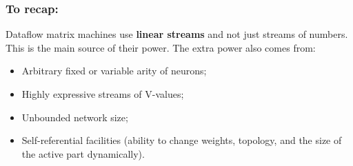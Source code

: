 \documentclass{beamer}
\newcommand{\msmagenta}[1]{{\color{mymagenta} #1}}
\begin{document}
\begin{comment}

\begin{frame}

  \frametitle{\msmagenta{To recap:}}

DMMs: a novel class of {\bf ``neural abstract machines"}.\\[2ex]

Neurons process  {\bf linear streams} and not just streams of numbers.\\[2ex]

This  is the main source of the expressive power of DMMs.\\[2ex] The extra power also comes from:\\[1ex]

\begin{itemize}

\item Arbitrary fixed or variable arity of neurons;\\[2ex]

\item Highly expressive streams of V-values;\\[2ex]

\item Unbounded network size;\\[2ex]

\item Self-referential facilities (ability to change weights, topology, and the size of the active part dynamically).

\end{itemize}

\end{frame}

\end{comment}

\begin{frame}

  \frametitle{\msmagenta{To recap:}}

Dataflow matrix machines use {\bf linear streams} and not just streams of numbers.\\[2ex]

This is the main source of their power. The extra power also comes from:\\[2ex]

\begin{itemize}

\item Arbitrary fixed or variable arity of neurons;\\[2ex]

\item Highly expressive streams of V-values;\\[2ex]

\item Unbounded network size;\\[2ex]

\item Self-referential facilities (ability to change weights, topology, and the size of the active part dynamically).

\end{itemize}

\end{frame}
\end{document}
